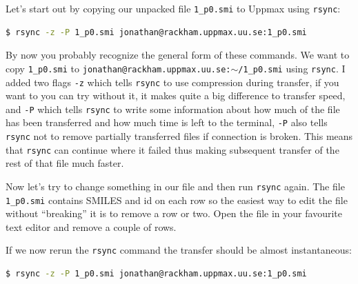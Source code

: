 \documentclass[watermark]{pbpreprint}
\begin{document}
Let's start out by copying our unpacked file \texttt{1\_p0.smi} to Uppmax using
\texttt{rsync}:
%
\begin{lstlisting}[language=bash,escapechar={|},basicstyle=\ttfamily\footnotesize]
$ rsync -z -P 1_p0.smi jonathan@rackham.uppmax.uu.se:1_p0.smi
\end{lstlisting}
By now you probably recognize the general form of these commands. We want to
copy \texttt{1\_p0.smi} to \texttt{jonathan@rackham.uppmax.uu.se:$\sim$/1\_p0.smi}
using \texttt{rsync}.  I added two flags \texttt{-z} which
tells \texttt{rsync} to use compression during transfer, if you want to you can
try without it, it makes quite a big difference to transfer speed, and
\texttt{-P} which tells \texttt{rsync} to write some information about how much
of the file has been transferred and how much time is left to the terminal,
\texttt{-P} also tells \texttt{rsync} not to remove partially transferred files
if connection is broken. This means that \texttt{rsync} can continue where it
failed thus making subsequent transfer of the rest of that file much faster. 

Now let's try to change something in our file and then run \texttt{rsync}
again. The file \texttt{1\_p0.smi} contains SMILES and id on each row so the
easiest way to edit the file without ``breaking'' it is to remove a row or two.
Open the file in your favourite text editor and remove a couple of rows.

If we now rerun the \texttt{rsync} command the transfer should be almost
instantaneous:
%
\begin{lstlisting}[language=bash,escapechar={|},basicstyle=\ttfamily\footnotesize]
$ rsync -z -P 1_p0.smi jonathan@rackham.uppmax.uu.se:1_p0.smi
\end{lstlisting}
\end{document}
